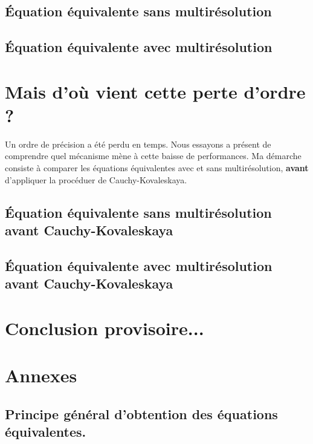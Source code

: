 \documentclass[11pt]{article}
\theoremstyle{definition}
\theoremstyle{remark}
\begin{document}
    \subsection{Équation équivalente sans multirésolution}
    
    \subsection{Équation équivalente avec multirésolution}
    

\newpage
\section{Mais d'où vient cette perte d'ordre ?}
    Un ordre de précision a été perdu en temps. Nous essayons a présent de comprendre quel mécanisme mène à cette baisse de performances.
    Ma démarche consiste à comparer les équations équivalentes avec et sans multirésolution, \textbf{avant} d'appliquer la procéduer de Cauchy-Kovaleskaya.
    \subsection{Équation équivalente sans multirésolution avant Cauchy-Kovaleskaya}
    
    \subsection{Équation équivalente avec multirésolution avant Cauchy-Kovaleskaya}
    

\section{Conclusion provisoire...}
    

\newpage
\appendix
\section{Annexes}
\subsection{Principe général d'obtention des équations équivalentes.}


\printbibliography
\end{document}
